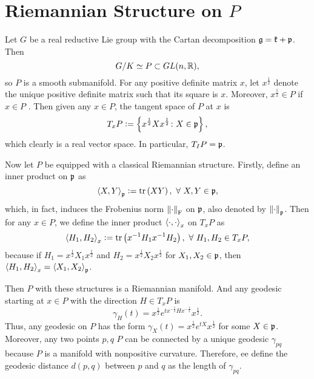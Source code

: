 \documentclass[suri,pdfbookmark]{engsuribt} %
\begin{document}
  \section{Riemannian Structure on \texorpdfstring{$P$}{P}}

  Let $G$ be a real reductive Lie group with the Cartan decomposition $\mathfrak{g} = \mathfrak{k}+\mathfrak{p}$. Then
  \begin{equation*}
    G/K \simeq P \subset GL(n,\mathbb{R}),
  \end{equation*}
  so $P$ is a smooth submanifold. For any positive definite matrix $x$, let $x^{\frac{1}{2}}$ denote the unique positive definite matrix such that its square is $x$. Moreover, $x^{\frac{1}{2}} \in P$ if $x \in P$ \cite{key5}. Then given any $x \in P$, the tangent space of $P$ at $x$ is
  \begin{equation*}
    T_xP \vcentcolon= \left\{x^{\frac{1}{2}}Xx^{\frac{1}{2}} \colon X \in \mathfrak{p}\right\},
  \end{equation*}
  which clearly is a real vector space. In particular, $T_IP = \mathfrak{p}$.

  Now let $P$ be equipped with a classical Riemannian structure. Firstly, define an inner product on $\mathfrak{p}$ as
  \begin{equation*}
    \left\langle X,Y \right\rangle_{\mathfrak{p}} \vcentcolon= \operatorname{tr} \left(XY\right),~\forall~ X,Y \in \mathfrak{p},
  \end{equation*}
  which, in fact, induces the Frobenius norm $\left\lVert\cdot\right\lVert_{\operatorname{F}}$ on $\mathfrak{p}$, also denoted by $\left\lVert\cdot\right\lVert_{\mathfrak{p}}$. Then for any $x \in P$, we define the inner product $\left\langle \cdot,\cdot \right\rangle_x$ on $T_xP$ as
  \begin{equation*}
    \left\langle H_1,H_2 \right\rangle_x \vcentcolon= \operatorname{tr}\left(x^{-1}H_1x^{-1}H_2\right),~\forall~ H_1,H_2 \in T_xP,
  \end{equation*}
  because if $H_1 = x^{\frac{1}{2}}X_1x^{\frac{1}{2}}$ and $H_2 = x^{\frac{1}{2}}X_2x^{\frac{1}{2}}$ for $X_1,X_2 \in \mathfrak{p}$, then $\left\langle H_1,H_2 \right\rangle_x = \left\langle X_1,X_2 \right\rangle_{\mathfrak{p}}$. 

  Then $P$ with these structures is a Riemannian manifold. And any geodesic starting at $x \in P$ with the direction $H \in T_xP$ is 
  \begin{equation*}
    \gamma_H(t) = x^{\frac{1}{2}} e^{tx^{-\frac{1}{2}}Hx^{-\frac{1}{2}}} x^{\frac{1}{2}}.
  \end{equation*}
  Thus, any geodesic on $P$ has the form $\gamma_X(t) = x^{\frac{1}{2}}e^{tX}x^{\frac{1}{2}}$ for some $X \in \mathfrak{p}$. Moreover, any two points $p,q$ $P$ can be connected by a unique geodesic $\gamma_{pq}$ because $P$ is a  manifold with nonpositive curvature. Therefore, ee define the geodesic distance $d(p,q)$ between $p$ and  $q$ as the length of $\gamma_{pq}$.
\end{document}
